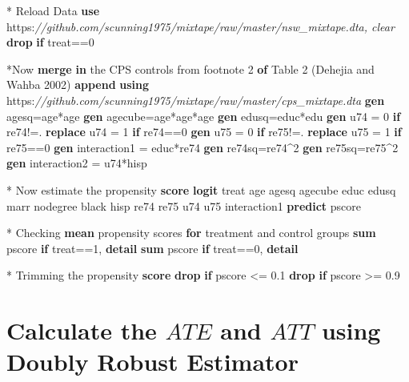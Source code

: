 \documentclass[
]{book}
\newenvironment{Shaded}{\begin{snugshade}}{\end{snugshade}}
\newcommand{\BaseNTok}[1]{\textcolor[rgb]{0.00,0.00,0.81}{#1}}
\newcommand{\CommentTok}[1]{\textcolor[rgb]{0.56,0.35,0.01}{\textit{#1}}}
\newcommand{\KeywordTok}[1]{\textcolor[rgb]{0.13,0.29,0.53}{\textbf{#1}}}
\newcommand{\NormalTok}[1]{#1}
\begin{document}
\begin{Shaded}
\begin{Highlighting}[]
\NormalTok{* Reload Data}
\KeywordTok{use}\NormalTok{ https:}\CommentTok{//github.com/scunning1975/mixtape/raw/master/nsw\_mixtape.dta, clear}
\KeywordTok{drop} \KeywordTok{if}\NormalTok{ treat==0}

\NormalTok{*Now }\KeywordTok{merge} \KeywordTok{in}\NormalTok{ the CPS controls from footnote 2 }\KeywordTok{of}\NormalTok{ Table 2 (Dehejia and Wahba 2002)}
\KeywordTok{append} \KeywordTok{using}\NormalTok{ https:}\CommentTok{//github.com/scunning1975/mixtape/raw/master/cps\_mixtape.dta}
\KeywordTok{gen}\NormalTok{ agesq=age*age}
\KeywordTok{gen}\NormalTok{ agecube=age*age*age}
\KeywordTok{gen}\NormalTok{ edusq=educ*edu}
\KeywordTok{gen}\NormalTok{ u74 = 0 }\KeywordTok{if}\NormalTok{ re74!=.}
\KeywordTok{replace}\NormalTok{ u74 = 1 }\KeywordTok{if}\NormalTok{ re74==0}
\KeywordTok{gen}\NormalTok{ u75 = 0 }\KeywordTok{if}\NormalTok{ re75!=.}
\KeywordTok{replace}\NormalTok{ u75 = 1 }\KeywordTok{if}\NormalTok{ re75==0}
\KeywordTok{gen}\NormalTok{ interaction1 = educ*re74}
\KeywordTok{gen}\NormalTok{ re74sq=re74\^{}2}
\KeywordTok{gen}\NormalTok{ re75sq=re75\^{}2}
\KeywordTok{gen}\NormalTok{ interaction2 = u74*hisp}

\NormalTok{* Now estimate the propensity }\KeywordTok{score}
\KeywordTok{logit}\NormalTok{ treat age agesq agecube educ edusq marr nodegree }\BaseNTok{black}\NormalTok{ hisp re74 re75 u74 u75 interaction1 }
\KeywordTok{predict}\NormalTok{ pscore}

\NormalTok{* Checking }\KeywordTok{mean}\NormalTok{ propensity scores }\KeywordTok{for}\NormalTok{ treatment and control groups}
\KeywordTok{sum}\NormalTok{ pscore }\KeywordTok{if}\NormalTok{ treat==1, }\KeywordTok{detail}
\KeywordTok{sum}\NormalTok{ pscore }\KeywordTok{if}\NormalTok{ treat==0, }\KeywordTok{detail}

\NormalTok{* Trimming the propensity }\KeywordTok{score}
\KeywordTok{drop} \KeywordTok{if}\NormalTok{ pscore \textless{}= 0.1 }
\KeywordTok{drop} \KeywordTok{if}\NormalTok{ pscore \textgreater{}= 0.9}
\end{Highlighting}
\end{Shaded}

\section{\texorpdfstring{Calculate the \(ATE\) and \(ATT\) using Doubly Robust Estimator}{Calculate the ATE and ATT using Doubly Robust Estimator}}\label{calculate-the-ate-and-att-using-doubly-robust-estimator}
\end{document}
